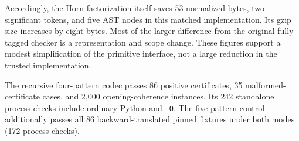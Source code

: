 Accordingly, the Horn factorization itself saves 53 normalized bytes,
two significant tokens, and five AST nodes in this matched implementation.
Its gzip size increases by eight bytes. Most of the larger difference
from the original fully tagged checker is a representation and scope
change. These figures support a modest simplification of the primitive
interface, not a large reduction in the trusted implementation.

The recursive four-pattern codec passes 86 positive certificates, 35
malformed-certificate cases, and 2,000 opening-coherence instances.
Its 242 standalone process checks include ordinary Python and
\texttt{-O}. The five-pattern control additionally passes all 86
backward-translated pinned fixtures under both modes (172 process checks).
